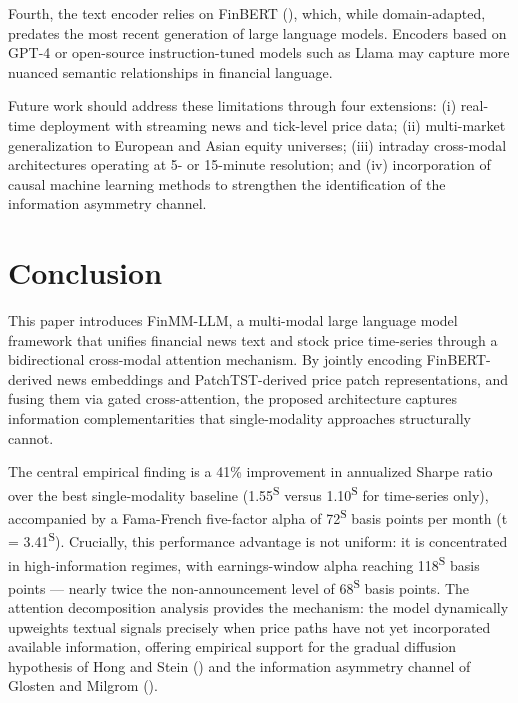 \documentclass[
  11pt,
  a4paper,
]{article}
\begin{document}
Fourth, the text encoder relies on FinBERT (), which, while domain-adapted, predates the most recent
generation of large language models. Encoders based on GPT-4 or
open-source instruction-tuned models such as Llama may capture more
nuanced semantic relationships in financial language.

Future work should address these limitations through four extensions:
(i) real-time deployment with streaming news and tick-level price data;
(ii) multi-market generalization to European and Asian equity universes;
(iii) intraday cross-modal architectures operating at 5- or 15-minute
resolution; and (iv) incorporation of causal machine learning methods to
strengthen the identification of the information asymmetry channel.

\section{Conclusion}\label{conclusion}

This paper introduces FinMM-LLM, a multi-modal large language model
framework that unifies financial news text and stock price time-series
through a bidirectional cross-modal attention mechanism. By jointly
encoding FinBERT-derived news embeddings and PatchTST-derived price
patch representations, and fusing them via gated cross-attention, the
proposed architecture captures information complementarities that
single-modality approaches structurally cannot.

The central empirical finding is a 41\% improvement in annualized Sharpe
ratio over the best single-modality baseline (1.55\textsuperscript{S}
versus 1.10\textsuperscript{S} for time-series only), accompanied by a
Fama-French five-factor alpha of 72\textsuperscript{S} basis points per
month (t = 3.41\textsuperscript{S}). Crucially, this performance
advantage is not uniform: it is concentrated in high-information
regimes, with earnings-window alpha reaching 118\textsuperscript{S}
basis points --- nearly twice the non-announcement level of
68\textsuperscript{S} basis points. The attention decomposition analysis
provides the mechanism: the model dynamically upweights textual signals
precisely when price paths have not yet incorporated available
information, offering empirical support for the gradual diffusion
hypothesis of Hong and Stein () and
the information asymmetry channel of Glosten and Milgrom
().
\end{document}
